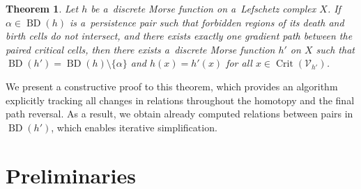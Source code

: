 \documentclass[a4paper,12pt, USenglish,cleveref,autoref,thm-restate]{article}
\newtheorem{theorem}{Theorem}
\newcommand\dmitriy[1]{\textcolor{teal}{[DM: #1]}}
\newcommand{\mf}{h}
\newcommand{\omf}{h'}
\DeclareMathOperator{\bd}{BD}
\newcommand{\RR}{\mathbb{R}}
\newcommand{\bds}{\alpha}
\newcommand{\cV}{\mathcal{V}}
\DeclareMathOperator{\crit}{Crit}
\begin{document}
\begin{theorem}\label{thm:main-theorem}
    Let $h$ be a~discrete Morse function on a~Lefschetz complex $X$. 
    If $\bds\in\bd(h)$ is a~persistence pair such that  forbidden regions of its death and birth cells do not intersect,
    and there exists exactly one gradient path between the paired critical cells,
    then there exists a~discrete Morse function $h'$ on $X$ such that 
        $\bd(h')=\bd(h)\setminus\{\bds\}$
        and $\mf(x)=\omf(x)$ for all $x\in\crit(\cV_{\omf})$. 
\end{theorem}



\noindent We present a constructive proof to this theorem,
    which provides an algorithm explicitly tracking all changes in relations throughout the homotopy and the final path reversal. 
As a result, we obtain already computed relations between pairs in $\bd(h')$, which enables iterative simplification.



\section{Preliminaries}
\label{sec:preliminaries}
\end{document}
